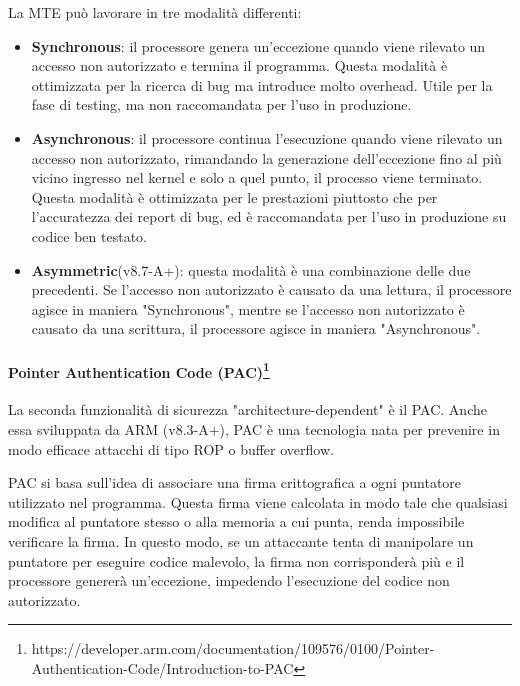La MTE può lavorare in tre modalità differenti:
\begin{itemize}
  \item \textbf{Synchronous}: il processore genera un'eccezione quando viene rilevato
    un accesso non autorizzato e termina il programma. Questa modalità è
    ottimizzata per la ricerca di bug ma introduce molto overhead. Utile per la fase
    di testing, ma non raccomandata per l'uso in produzione.

  \item \textbf{Asynchronous}: il processore continua l'esecuzione quando viene rilevato
    un accesso non autorizzato, rimandando la generazione dell'eccezione fino al
    più vicino ingresso nel kernel e solo a quel punto, il processo viene terminato.
    Questa modalità è ottimizzata per le prestazioni piuttosto che per l'accuratezza
    dei report di bug, ed è raccomandata per l'uso in produzione su codice ben testato.

  \item \textbf{Asymmetric}(v8.7-A+): questa modalità è una combinazione delle
    due precedenti. Se l'accesso non autorizzato è causato da una lettura, il
    processore agisce in maniera "Synchronous", mentre se l'accesso non autorizzato
    è causato da una scrittura, il processore agisce in maniera "Asynchronous".
\end{itemize}

\paragraph{Pointer Authentication Code (PAC)\protect\footnote{https://developer.arm.com/documentation/109576/0100/Pointer-Authentication-Code/Introduction-to-PAC}}
La seconda funzionalità di sicurezza "architecture-dependent" è il PAC. Anche
essa sviluppata da ARM (v8.3-A+), PAC è una tecnologia nata per prevenire in modo
efficace attacchi di tipo ROP o buffer overflow.

PAC si basa sull'idea di associare una firma crittografica a ogni puntatore utilizzato
nel programma. Questa firma viene calcolata in modo tale che qualsiasi modifica
al puntatore stesso o alla memoria a cui punta, renda impossibile verificare la firma.
In questo modo, se un attaccante tenta di manipolare un puntatore per eseguire codice
malevolo, la firma non corrisponderà più e il processore genererà un'eccezione, impedendo
l'esecuzione del codice non autorizzato.

